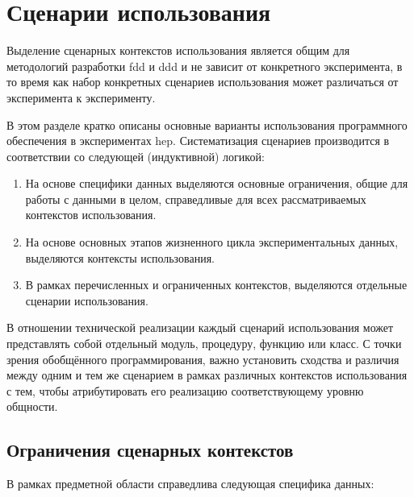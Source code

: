 \section{Сценарии использования}

Выделение сценарных контекстов использования является общим для методологий
разработки \acrshort{fdd} и \acrshort{ddd} и не зависит от конкретного
эксперимента, в то время
как набор конкретных сценариев использования может различаться от
эксперимента к эксперименту.

В этом разделе кратко описаны основные варианты использования программного
обеспечения в экспериментах \acrshort{hep}. Систематизация сценариев
производится в соответствии со следующей (индуктивной) логикой:
\begin{enumerate}
    \item На основе специфики данных выделяются основные ограничения,
    общие для работы с данными в целом, справедливые для всех
    рассматриваемых контекстов использования.
    \item На основе основных этапов жизненного цикла экспериментальных
    данных, выделяются контексты использования.
    \item В рамках перечисленных и ограниченных контекстов, выделяются
    отдельные сценарии использования.
\end{enumerate}

В отношении технической реализации каждый сценарий использования
может представлять собой отдельный модуль,
процедуру, функцию или класс. С точки зрения
обобщённого программирования, важно установить сходства и различия
между одним и тем же сценарием в рамках различных контекстов
использования с тем, чтобы атрибутировать его реализацию соответствующему
уровню общности.

\subsection{Ограничения сценарных контекстов}

В рамках предметной области справедлива следующая специфика данных:


